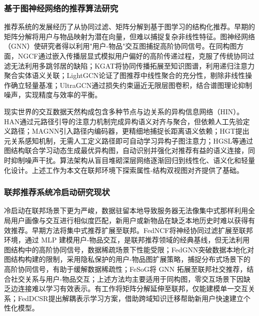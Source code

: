 \subsubsection{基于图神经网络的推荐算法研究}
推荐系统的发展经历了从协同过滤、矩阵分解到基于图学习的结构化推荐。早期的矩阵分解将用户与物品映射为潜在向量，但难以捕捉复杂非线性特征\cite{wang2019ngcf}。图神经网络（GNN）\allowbreak\cite{kipf2016semi}使研究者得以利用"用户-物品"交互图捕捉高阶协同信号\allowbreak\cite{he2020lightgcn}。在同构图方面，NGCF\allowbreak\cite{wang2019ngcf}通过嵌入传播层显式模拟用户偏好的高阶传递过程，克服了传统协同过滤无法利用多跳邻居的缺陷；KGAT\allowbreak\cite{wang2019kgat}将协同传播拓展至知识图谱，利用递归注意力聚合实体语义关联；LightGCN\allowbreak\cite{he2020lightgcn}论证了图推荐中线性聚合的充分性，剔除非线性操作确立轻量基准；UltraGCN\allowbreak\cite{mao2021ultragcn}通过损失约束逼近无限层图卷积，结合谱图理论抑制噪声，实现精度与效率的平衡。

现实世界的交互数据天然构成包含多种节点与边关系的异构信息网络（HIN）\allowbreak\cite{wang2019han}。HAN\allowbreak\cite{wang2019han}通过元路径引导的注意力机制完成异构语义对齐与聚合，但依赖人工先验定义路径；MAGNN\allowbreak\cite{fu2020magnn}引入路径内编码器，更精细地捕捉长距离语义依赖；HGT\allowbreak\cite{hu2020hgt}提出元关系感知机制，无需人工定义路径即可自动学习异构子图注意力；HGSL\allowbreak\cite{zhao2021hgsl}等通过图结构联合学习动态生成最优异构图，自动识别并强化对推荐有益的语义连接，同时抑制噪声干扰。算法架构从盲目堆砌深层网络逐渐回归到线性化、语义化和轻量化设计。上述工作为本文在联邦环境下探索属性-结构双视图对齐提供了基础。

\subsubsection{联邦推荐系统冷启动研究现状}
冷启动在联邦场景下更为严峻，数据驻留本地导致服务器无法像集中式那样利用全局用户画像与交互进行相似度匹配，新用户或新物品在缺乏本地历史时难以获得有效推荐。早期方法将集中式推荐扩展至联邦。FedNCF\cite{jiang2022fedncf}将神经协同过滤扩展至联邦环境，通过 MLP 建模用户-物品交互，是联邦推荐领域的经典基线，但无法利用图结构中的高阶协同信号，数据稀疏场景下性能受限；FedGNN\cite{wu2021fedgnn}突破数据本地化对图结构构建的限制，采用隐私保护的用户-物品图扩展策略，捕捉分布式场景下的高阶协同信号，有助于缓解数据稀疏性；FeSoG\cite{liu2021fesog}将 GNN 拓展至联邦社交推荐，结合社交关系与用户-物品交互；上述方法均主要适用于同构图，零交互场景下因缺乏边连接难以学习有效表示。有工作将矩阵分解延伸至联邦\cite{ye2023heterogeneous}，仅能建模单一交互关系；FedDCSR\cite{zhang2024feddcsr}提出解耦表示学习方案，借助跨域知识迁移帮助新用户快速建立个性化模型。

